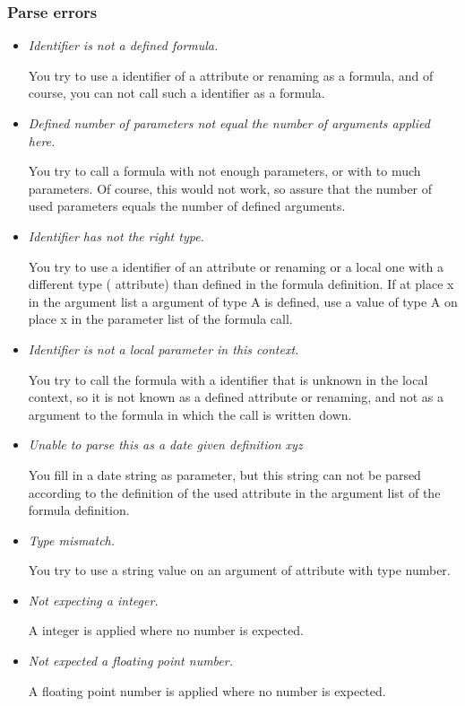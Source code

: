 \subsubsection{Parse errors}

\begin{itemize}
    \item \textit{Identifier is not a defined formula.}
    
You try to use a identifier of a attribute or renaming as a formula, and of
course, you can not call such a identifier as a formula.

    \item \textit{Defined number of parameters not equal the number of arguments applied
here.}

You try to call a formula with not enough parameters, or with to much
parameters. Of course, this would not work, so assure that the number of used
parameters equals the number of defined arguments.

    \item \textit{Identifier has not the right type.}
    
You try to use a identifier of an attribute or renaming or a local one with a
different type ( attribute) than defined in the formula definition. If at
place x in the argument list a argument of type A is defined, use a value of
type A on place x in the parameter list of the formula call.

    \item \textit{Identifier is not a local parameter in this context.}
    
You try to call the formula with a identifier that is unknown in the local
context, so it is not known as a defined attribute or renaming, and not as a
argument to the formula in which the call is written down.

    \item \textit{Unable to parse this as a date given definition \textit{xyz}}
    
You fill in a date string as parameter, but this string can not be parsed
according to the definition of the used attribute in the argument list of the
formula definition.

    \item \textit{Type mismatch.}
    
You try to use a string value on an argument of attribute with type number.

    \item \textit{Not expecting a integer.}
    
A integer is applied where no number is expected.

    \item \textit{Not expected a floating point number.}
    
A floating point number is applied where no number is expected.

\end{itemize}

